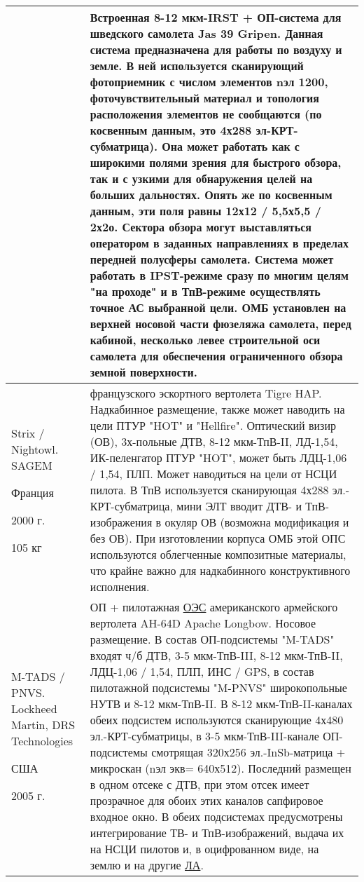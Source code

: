 \begin{landscape}
\begin{longtable}{| p{6cm} | p{18cm} |}
	& 
		\small Встроенная 8-12 мкм-IRST + ОП-система для шведского самолета Jas 39 Gripen.  Данная система предназначена для работы по воздуху и земле. В ней используется сканирующий фотоприемник с числом элементов nэл 1200, фоточувствительный материал и топология расположения элементов не сообщаются (по косвенным данным, это 4х288 эл-КРТ-субматрица). Она может работать как с широкими полями зрения для быстрого обзора, так и с узкими для обнаружения целей на больших дальностях. Опять же по косвенным данным, эти поля равны 12х12 / 5,5х5,5 / 2х2о. 
		\small Сектора обзора могут выставляться оператором в заданных направлениях в пределах передней полусферы самолета. Система может работать в IPST-режиме сразу по многим целям "на проходе" и в ТпВ-режиме осуществлять точное АС выбранной цели. 
		\small ОМБ установлен на верхней носовой части фюзеляжа самолета, перед кабиной, несколько левее строительной оси самолета для обеспечения ограниченного обзора земной поверхности. 
		 
	\\ \hline
		Strix / Nightowl. SAGEM	
		
		Франция	
		
		2000 г. 	
		
		105 кг 
	& 
		 французского эскортного вертолета Tigre HAP. Надкабинное размещение, также может наводить на цели ПТУР "HOT" и "Hellfire". Оптический визир (ОВ), 3х-польные ДТВ, 8-12 мкм-ТпВ-II, ЛД-1,54, ИК-пеленгатор ПТУР "HOT", может быть ЛДЦ-1,06 / 1,54, ПЛП. Может наводиться на цели от НСЦИ пилота. В ТпВ используется сканирующая 4х288 эл.-КРТ-субматрица, мини ЭЛТ вводит ДТВ- и ТпВ-изображения в окуляр ОВ (возможна модификация и без ОВ). При изготовлении корпуса ОМБ этой ОПС используются облегченные композитные материалы, что крайне важно для надкабинного конструктивного исполнения.
		 
	\\ \hline
		M-TADS / PNVS. Lockheed Martin, DRS Technologies
		\cite[]{lockheedmartin}
		
		США	
		
		2005 г. 
		 
	& 
		\small ОП + пилотажная  \hyperref[acroEOS]{ОЭС} американского армейского вертолета AH-64D Apache Longbow. Носовое размещение. В состав ОП-подсистемы "M-TADS" входят ч/б ДТВ, 3-5 мкм-ТпВ-III, 8-12 мкм-ТпВ-II, ЛДЦ-1,06 / 1,54, ПЛП, ИНС / GPS, в состав пилотажной подсистемы "M-PNVS" широкопольные НУТВ и 8-12 мкм-ТпВ-II. В 8-12 мкм-ТпВ-II-каналах обеих подсистем используются сканирующие 4х480 эл.-КРТ-субматрицы, в 3-5 мкм-ТпВ-III-канале ОП-подсистемы смотрящая 320х256 эл.-InSb-матрица + микроскан (nэл экв= 640х512). Последний размещен в одном отсеке с ДТВ, при этом отсек имеет прозрачное для обоих этих каналов сапфировое входное окно. В обеих подсистемах предусмотрены интегрирование ТВ- и ТпВ-изображений, выдача их на НСЦИ пилотов и, в оцифрованном виде, на землю и на другие  \hyperref[acroLA]{ЛА}.
		 

\end{longtable}
\end{landscape}

